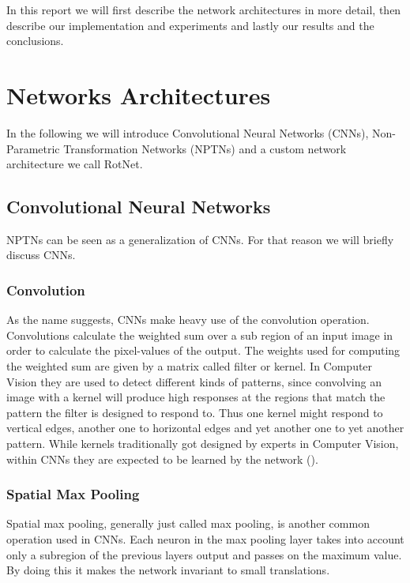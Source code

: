 \documentclass{llncs}
\begin{document}
In this report we will first describe the network architectures in more detail, then describe our implementation and experiments and lastly our results and the conclusions.

\section{Networks Architectures} In the following we will introduce Convolutional Neural Networks (CNNs), Non-Parametric Transformation Networks (NPTNs) and a custom network architecture we call RotNet.

\subsection{Convolutional Neural Networks}
NPTNs can be seen as a generalization of CNNs. For that reason we will briefly discuss CNNs. 
\subsubsection{Convolution}
As the name suggests, CNNs make heavy use of the convolution operation. Convolutions
 calculate the weighted sum over a sub region of an input image in order to calculate the pixel-values of the output. The weights used for computing the weighted sum are given by a matrix called filter or kernel. In Computer Vision they are used to detect different kinds of patterns, since convolving an image with a kernel will produce high responses at the regions that match the pattern the filter is designed to respond to. Thus one kernel might respond to vertical edges, another  one to horizontal edges and yet another one to yet another pattern. While kernels traditionally got designed by experts in Computer Vision, within CNNs they are expected to be learned by the network (\cite{ConvArithmetic16}).


\subsubsection{Spatial Max Pooling}
Spatial max pooling, generally just called max pooling, is another common operation used in CNNs.
Each neuron in the max pooling layer takes into account only a subregion of the previous
layers output and passes on the maximum value. By doing this it makes the network invariant to small translations. 
\end{document}

